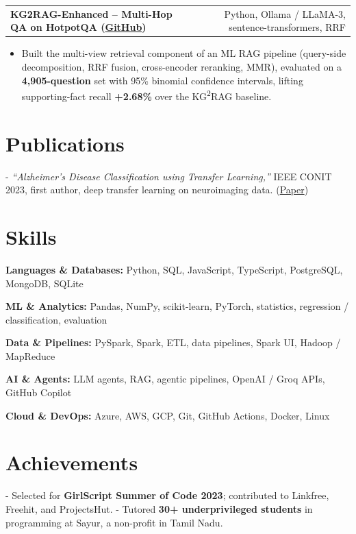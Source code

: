 \documentclass[letterpaper,11pt]{article}
\makeatletter
\newcommand{\projItem}[2]{%
  \vspace{6pt}
  \begin{tabular*}{\textwidth}{@{}l@{\extracolsep{\fill}}r@{}}
    \textbf{#1} & #2 \\
  \end{tabular*}\par\vspace{-2pt}
}
\newcommand{\skillLine}[2]{\textbf{#1:} #2\par\vspace{2pt}}
\newcommand{\inlineBlock}[1]{{\setlength{\leftskip}{0.18in}\small #1\par}}
\makeatother
\begin{document}
\projItem{KG2RAG-Enhanced -- Multi-Hop QA on HotpotQA {\normalfont\small(\href{https://github.com/Deva-1903/KG2RAG-685-NLP}{GitHub})}}{Python, Ollama / LLaMA-3, sentence-transformers, RRF}
\begin{itemize}
  \item Built the multi-view retrieval component of an ML RAG pipeline (query-side decomposition, RRF fusion, cross-encoder reranking, MMR), evaluated on a \textbf{4{,}905-question} set with 95\% binomial confidence intervals, lifting supporting-fact recall \textbf{+2.68\%} over the KG\textsuperscript{2}RAG baseline.
\end{itemize}

\section{Publications}
\inlineBlock{- \textit{``Alzheimer's Disease Classification using Transfer Learning,''} IEEE CONIT 2023, first author, deep transfer learning on neuroimaging data. {\normalfont\small(\href{https://ieeexplore.ieee.org/document/10205760}{Paper})}}

\section{Skills}
\skillLine{Languages \& Databases}{Python, SQL, JavaScript, TypeScript, PostgreSQL, MongoDB, SQLite}
\skillLine{ML \& Analytics}{Pandas, NumPy, scikit-learn, PyTorch, statistics, regression / classification, evaluation}
\skillLine{Data \& Pipelines}{PySpark, Spark, ETL, data pipelines, Spark UI, Hadoop / MapReduce}
\skillLine{AI \& Agents}{LLM agents, RAG, agentic pipelines, OpenAI / Groq APIs, GitHub Copilot}
\skillLine{Cloud \& DevOps}{Azure, AWS, GCP, Git, GitHub Actions, Docker, Linux}

\section{Achievements}
\inlineBlock{- Selected for \textbf{GirlScript Summer of Code 2023}; contributed to Linkfree, Freehit, and ProjectsHut. - Tutored \textbf{30+ underprivileged students} in programming at Sayur, a non-profit in Tamil Nadu.}
\end{document}
